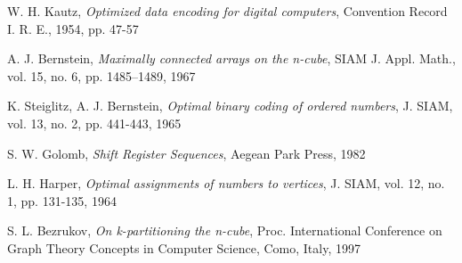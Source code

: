 \documentclass[12pt, a4paper]{article}
\begin{document}
\begin{thebibliography}{99}

	W. H. Kautz,
	\emph{Optimized data encoding for digital computers},
	Convention Record I. R. E., 1954, pp. 47-57

	A. J. Bernstein,
	\emph{Maximally connected arrays on the n-cube},
	SIAM J. Appl. Math., vol. 15, no. 6, pp. 1485–1489, 1967

	K. Steiglitz, A. J. Bernstein,
	\emph{Optimal binary coding of ordered numbers},
	J. SIAM, vol. 13, no. 2, pp. 441-443, 1965

	S. W. Golomb,
	\emph{Shift Register Sequences},
	Aegean Park Press, 1982

	L. H. Harper,
	\emph{Optimal assignments of numbers to vertices},
	J. SIAM, vol. 12, no. 1, pp. 131-135, 1964

	S. L. Bezrukov,
	\emph{On k-partitioning the n-cube},
	Proc. International Conference on Graph Theory Concepts in Computer Science, Como, Italy, 1997

\end{thebibliography}
\end{document}
